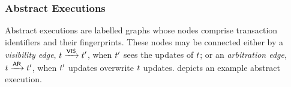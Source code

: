 \subsubsection{Abstract Executions}
Abstract executions are labelled graphs 
whose nodes comprise transaction identifiers and their fingerprints. 
These nodes may be connected either by a \emph{visibility edge}, $t \xrightarrow{\mathsf{VIS}} 
t'$, when $t'$ sees the updates of $t$;  or an \emph{arbitration edge}, $t \xrightarrow{\mathsf{AR}} 
t'$, when $t'$ updates overwrite $t$ updates.
 depicts an example abstract execution.
